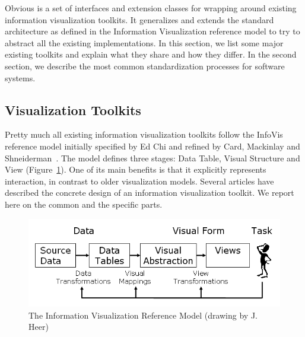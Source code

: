 Obvious is a set of interfaces and extension classes for wrapping
around existing information visualization toolkits.  It generalizes
and extends the standard architecture as defined in the Information
Visualization reference model to try to abstract all the existing
implementations.  In this section, we list some major existing
toolkits and explain what they share and how they differ.  In the
second section, we describe the most common standardization processes
for software systems.

\subsection{Visualization Toolkits}

Pretty much all existing information visualization toolkits follow the
InfoVis reference model initially specified by Ed Chi and refined by
Card, Mackinlay and Shneiderman~\cite{ChiRefModel,ReadingsIV}.  The
model defines three stages: Data Table, Visual Structure and View
(Figure~\ref{fig:refmodel}).  One of its main benefits is that it
explicitly represents interaction, in contrast to older visualization models.
Several articles have described the concrete design of an information
visualization toolkit.  We report here on the common and the
specific parts.

\begin{figure}
\includegraphics[width=\columnwidth]{figures/reference_model}
\caption{The Information Visualization Reference Model (drawing by
  J. Heer)}
\label{fig:refmodel}
\end{figure}


